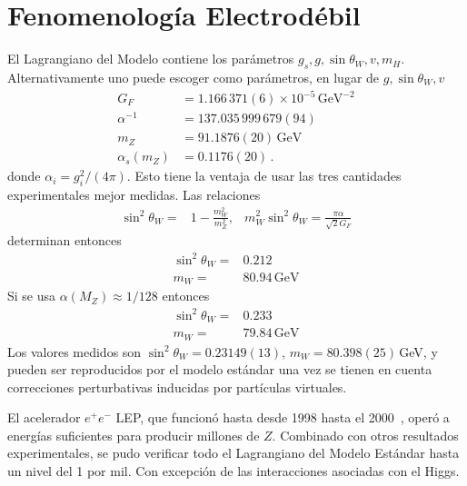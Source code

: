 \section{Fenomenología Electrodébil}
\label{sec:fenom-electr}
\begin{frame}
El Lagrangiano del Modelo contiene los parámetros $g_s,g,\sin\theta_W,v,m_H$. Alternativamente uno puede escoger como parámetros, en lugar de $g,\sin\theta_W,v$ \cite{a}
\begin{align}
  \label{eq:233qft}
  G_F&=1.166\,371(6)\times 10^{-5}\,\text{GeV}^{-2}\nonumber\\
  \alpha^{-1}&=137.035\,999\,679(94)\nonumber\\
  m_Z&=91.1876(20)\,\text{GeV}\nonumber\\
  \alpha_s(m_Z)&=0.1176(20)\,.
\end{align}
donde $\alpha_i=g_i^2/(4\pi)$. 
Esto tiene la ventaja de usar las tres cantidades experimentales mejor medidas. Las relaciones
\begin{align}
  \sin^2\theta_W=&1-\frac{m_W^2}{m_Z^2},&m_W^2\sin^2\theta_W=\frac{\pi\alpha}{\sqrt{2}G_F}
\end{align}
determinan entonces
\begin{align}
  \sin^2\theta_W=&0.212\nonumber\\
  m_W=&80.94\,\text{GeV}
\end{align}
Si se usa $\alpha(M_Z)\approx1/128$ entonces
\begin{align}
   \sin^2\theta_W=&0.233\nonumber\\
  m_W=&79.84\,\text{GeV}
\end{align}
Los valores medidos son $\sin^2\theta_W=0.23149(13)$, $m_W=80.398(25)\,$GeV, y pueden ser reproducidos por el modelo estándar una vez se tienen en cuenta correcciones perturbativas inducidas por partículas virtuales.

El acelerador $e^+e^-$ LEP, que funcionó hasta desde 1998 hasta el 2000~\cite{LEP}, operó a energías suficientes para producir millones de $Z$. Combinado con otros resultados experimentales, se pudo verificar todo el Lagrangiano del Modelo Estándar hasta un nivel del 1 por mil. Con excepción de las interacciones asociadas con el Higgs. 


\end{frame}
